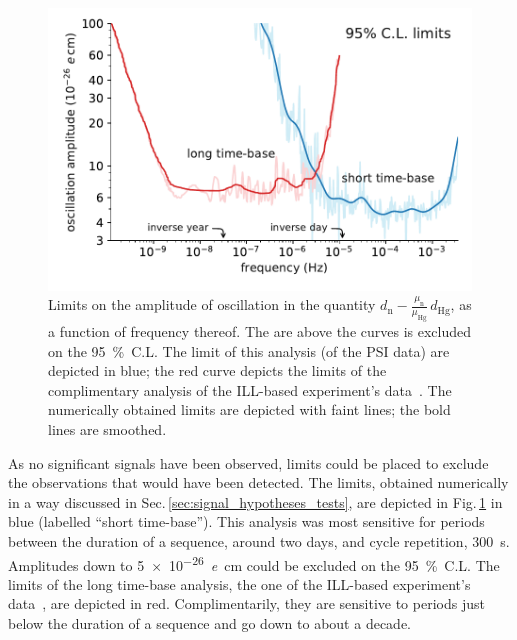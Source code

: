 \begin{figure}
  \centering
  \includegraphics[width=\linewidth]{gfx/axions/psi_ill_1e-26ecm.pdf}
  \caption{Limits on the amplitude of oscillation in the quantity $d_\text{n} - \frac{\mu_\text{n}}{\mu_\text{Hg}} \, d_\text{Hg}$, as a function of frequency thereof. The are above the curves is excluded on the \SI{95}{\percent}~C.L. The limit of this analysis (of the PSI data) are depicted in blue; the red curve depicts the limits of the complimentary analysis of the ILL-based experiment's data~\cite{AyresThesis,PhysRevX.7.041034}. The numerically obtained limits are depicted with faint lines; the bold lines are smoothed.}
\label{fig:axions_limits_nEDM}
\end{figure}

As no significant signals have been observed, limits could be placed to exclude the observations that would have been detected. The limits, obtained numerically in a way discussed in Sec.\,\ref{sec:signal_hypotheses_tests}, are depicted in Fig.\,\ref{fig:axions_limits_nEDM} in blue (labelled ``short time-base''). This analysis was most sensitive for periods between the duration of a sequence, around two days, and cycle repetition, \SI{300}{\second}. Amplitudes down to \SI{5e-26}{\elementarycharge\centi\meter} could be excluded on the \SI{95}{\percent}~C.L. The limits of the long time-base analysis, the one of the ILL-based experiment's data~\cite{AyresThesis,PhysRevX.7.041034}, are depicted in red. Complimentarily, they are sensitive to periods just below the duration of a sequence and go down to about a decade.

